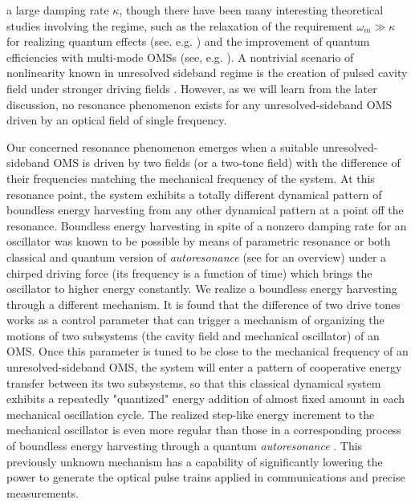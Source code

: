 \documentclass[a4paper,fleqn]{cas-dc}
\begin{document}
a large damping rate $\kappa$, though there have been many interesting theoretical studies involving the regime, such as the relaxation of the requirement $\omega_m\gg\kappa$ for realizing quantum effects (see. e.g. \cite{ojanen2014ground,bennett2016quantum,neumeier2018exploring,zhang2019strong,han2019mechanical,shahandeh2019optomechanical,zhang2020large,kanari2022two}) and the improvement of quantum efficiencies with multi-mode OMSs (see, e.g. \cite{lai2018simultaneous, lai2021domino, xu2022millionfold, lai2022efficient}). A nontrivial scenario of nonlinearity known in unresolved sideband regime is the creation of pulsed cavity field under stronger driving fields \cite{poot2012backaction,miri2018optomechanical,xu2021chip}. However, as we will learn from the later discussion, no resonance phenomenon exists for any unresolved-sideband OMS driven by an optical field of single frequency.

Our concerned resonance phenomenon emerges when a suitable unresolved-sideband OMS is driven by two fields (or a two-tone field) with the difference of their frequencies matching the mechanical frequency of the system. At this resonance point, the system exhibits a totally different dynamical pattern of boundless energy harvesting from any other dynamical pattern at a point off the resonance. Boundless energy harvesting in spite of a nonzero damping rate for an oscillator was known to be possible by means of parametric resonance \cite{fossen2011parametric} or both classical \cite{veksler1945new,mcmillan1945synchrotron} and quantum version \cite{marcus2004quantum,barth2014quantum} of {\it autoresonance} (see \cite{rajasekar2016nonlinear} for an overview) under a chirped driving force (its frequency is a function of time) which brings the oscillator to higher energy constantly. We realize a boundless energy harvesting through a different mechanism. 
It is found that the difference of two drive tones works as a control parameter that can trigger a mechanism of organizing the motions of two subsystems (the cavity field and mechanical oscillator) of an OMS. Once this parameter is tuned to be close to the mechanical frequency of an unresolved-sideband OMS, the system will enter a pattern of cooperative energy transfer between its two subsystems, so that this classical dynamical system exhibits a repeatedly "quantized" energy addition of almost fixed amount in each mechanical oscillation cycle. The realized step-like energy increment to the mechanical oscillator is even more regular than those in 
a corresponding process of boundless energy harvesting 
through a quantum {\it autoresonance} \cite{marcus2004quantum,barth2014quantum}. This previously unknown mechanism has a capability of significantly lowering the power to generate the optical pulse trains applied in communications and precise measurements.
\end{document}
